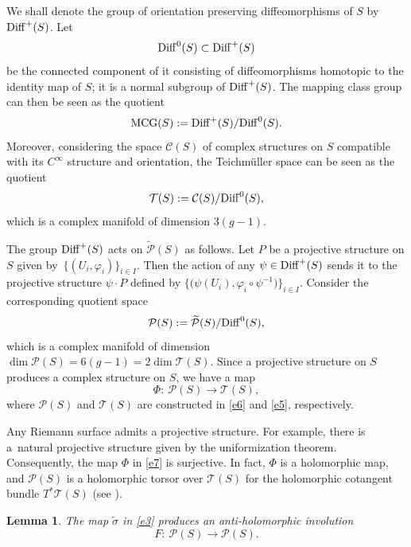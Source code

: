 \documentclass[10pt,a4paper]{amsart}
\numberwithin{equation}{section}
\newtheorem{Lemma}[Theorem]{Lemma}
\begin{document}
We shall denote the group of orientation preserving diffeomorphisms of $S$ by ${\rm Diff}^+(S)$. Let
\[
{\rm Diff}^0(S) \subset {\rm Diff}^+(S)
\]
be the connected component of it consisting of diffeomorphisms homotopic to the
identity map of $S$; it is a normal subgroup of ${\rm Diff}^+(S)$. The
mapping class group can then be seen as the quotient
\[
{\rm MCG}(S) := {\rm Diff}^+(S)/{\rm Diff}^0(S).
\]
Moreover, considering the space ${\mathcal C}(S)$ of complex structures on $S$
compatible with its $C^\infty$ structure and orientation, the Teichm\"uller space can be seen as the quotient
\begin{equation}\label{e5}
{\mathcal T}(S) := {\mathcal C}(S)/{\rm Diff}^0(S),
\end{equation}
which is a complex manifold of dimension $3(g-1)$.

The group ${\rm Diff}^+(S)$ acts on $\widetilde{\mathcal P}(S)$ as follows. Let $P$ be a projective structure on
$S$ given by~$\{(U_i, \varphi_i)\}_{i\in I}$. Then the action of any $\psi \in {\rm Diff}^+(S)$ sends it to
the projective structure $\psi\cdot P$ defined by $\big\{\bigl(\psi(U_i), \varphi_i\circ\psi^{-1}\bigr)\big\}_{i\in I}$.
Consider the corresponding quotient space
\begin{equation}\label{e6}
{\mathcal P}(S) :=
\widetilde{\mathcal P}(S)/{\rm Diff}^0(S),
\end{equation}
which is a complex manifold of dimension $\dim {\mathcal P}(S) = 6(g-1) = 2\dim {\mathcal T}(S)$.
Since a projective structure on $S$ produces a complex structure on $S$, we have a map
\begin{equation}\label{e7}
\Phi\colon\ {\mathcal P}(S) \longrightarrow {\mathcal T}(S),
\end{equation}
where ${\mathcal P}(S)$ and ${\mathcal T}(S)$ are constructed in \eqref{e6} and \eqref{e5}, respectively.

\begin{Remark} Any Riemann surface admits a projective structure.
For example, there is a~natural projective structure given by the uniformization theorem. Consequently, the map
$\Phi$ in \eqref{e7} is surjective. In fact, $\Phi$ is a holomorphic map, and ${\mathcal
P}(S)$ is a holomorphic torsor over ${\mathcal T}(S)$ for the holomorphic cotangent bundle
$T^*{\mathcal T}(S)$ (see \cite{Gu, He, Hu}).
\end{Remark}

\begin{Lemma}\label{lemmae8}
The map $\widetilde{\sigma}$ in \eqref{e3} produces an anti-holomorphic
involution
\begin{equation}\label{e8}
F\colon\ {\mathcal P}(S) \longrightarrow {\mathcal P}(S).
\end{equation}
\end{Lemma}
\end{document}
